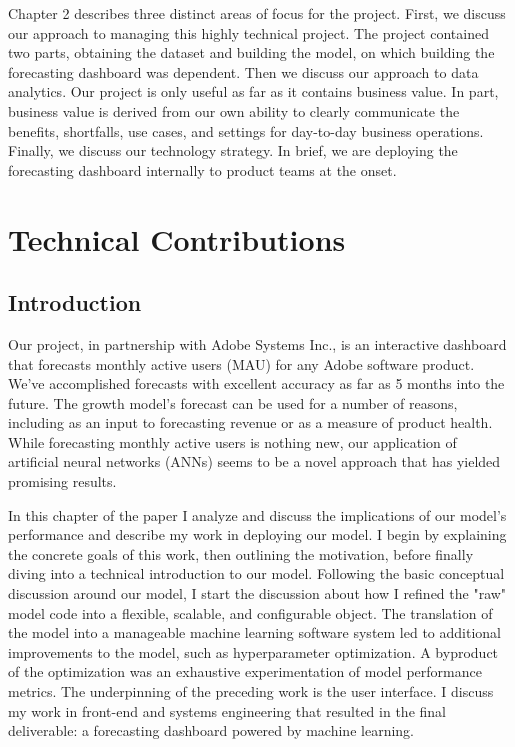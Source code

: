 \documentclass[11pt, oneside, authoryear]{report}
\begin{document}
Chapter 2 describes three distinct areas of focus for the project. First, we discuss our approach to managing this highly technical project. The project contained two parts, obtaining the dataset and building the model, on which building the forecasting dashboard was dependent. Then we discuss our approach to data analytics. Our project is only useful as far as it contains business value. In part, business value is derived from our own ability to clearly communicate the benefits, shortfalls, use cases, and settings for day-to-day business operations. Finally, we discuss our technology strategy. In brief, we are deploying the forecasting dashboard internally to product teams at the onset.

\chapter{Technical Contributions}

\section{Introduction}
Our project, in partnership with Adobe Systems Inc., is an interactive dashboard that forecasts monthly active users (MAU) for any Adobe software product. We've accomplished forecasts with excellent accuracy as far as 5 months into the future. The growth model's forecast can be used for a number of reasons, including as an input to forecasting revenue or as a measure of product health. While forecasting monthly active users is nothing new, our application of artificial neural networks (ANNs) seems to be a novel approach that has yielded promising results.

In this chapter of the paper I analyze and discuss the implications of our model's performance and describe my work in deploying our model. I begin by explaining the concrete goals of this work, then outlining the motivation, before finally diving into a technical introduction to our model. Following the basic conceptual discussion around our model, I start the discussion about how I refined the "raw" model code into a flexible, scalable, and configurable object. The translation of the model into a manageable machine learning software system led to additional improvements to the model, such as hyperparameter optimization. A byproduct of the optimization was an exhaustive experimentation of model performance metrics. The underpinning of the preceding work is the user interface. I discuss my work in front-end and systems engineering that resulted in the final deliverable: a forecasting dashboard powered by machine learning.
\end{document}
